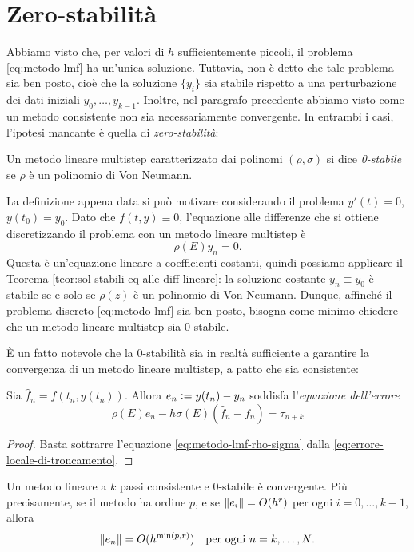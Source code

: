 \section{Zero-stabilità}
Abbiamo visto che, per valori di $h$ sufficientemente piccoli,
il problema \eqref{eq:metodo-lmf} ha un'unica soluzione.
Tuttavia, non è detto che tale problema sia ben posto,
cioè che la soluzione $\{y_i\}$ sia stabile rispetto a una perturbazione
dei dati iniziali $y_0,\dots,y_{k-1}$.
Inoltre, nel paragrafo precedente abbiamo visto come un metodo
consistente non sia necessariamente convergente.
In entrambi i casi, l'ipotesi mancante è quella di \emph{zero-stabilità}:

\begin{defi}
Un metodo lineare multistep caratterizzato dai polinomi $(\rho,\sigma)$
si dice \emph{0-stabile} se $\rho$ è un polinomio di Von Neumann.
\end{defi}

\noindent La definizione appena data si può motivare considerando il problema
$y'(t) = 0$, $y(t_0)=y_0$.
Dato che $f(t,y) \equiv 0$, l'equazione alle differenze che si ottiene
discretizzando il problema con un metodo lineare multistep è
\[
\rho(E)y_n = 0.
\]
Questa è un'equazione lineare a coefficienti costanti, quindi
possiamo applicare il Teorema \ref{teor:sol-stabili-eq-alle-diff-lineare}:
la soluzione costante $y_n \equiv y_0$ è stabile se e solo se
$\rho(z)$ è un polinomio di Von Neumann.
Dunque, affinché il problema discreto \eqref{eq:metodo-lmf} sia ben posto,
bisogna come minimo chiedere che un metodo lineare multistep sia
0-stabile.

È un fatto notevole che la 0-stabilità sia in realtà sufficiente a garantire
la convergenza di un metodo lineare multistep, a patto che sia consistente:

\begin{teor}
Sia $\hat{f}_n = f(t_n,y(t_n))$.
Allora $e_n \vcentcolon= y(t_n) - y_n$ soddisfa l'\emph{equazione dell'errore}
\begin{equation}\label{eq:equazione-dell-errore-lmf}
\rho(E) e_n - h \sigma(E) (\hat{f}_n-f_n) = \tau_{n+k}
\end{equation}
\end{teor}

\begin{proof}
Basta sottrarre l'equazione \eqref{eq:metodo-lmf-rho-sigma}
dalla \eqref{eq:errore-locale-di-troncamento}.
\end{proof}

\begin{teor}\label{teor:ordine-convergenza-lmf}
Un metodo lineare a $k$ passi consistente e 0-stabile è convergente.
Più precisamente, se il metodo ha ordine $p$,
e se $\left\lVert e_i\right\rVert = O(h^r)$ per ogni $i = 0,\dots,k-1$, allora
\[
\left\lVert e_n\right\rVert = O(h^{\min(p,r)}) \quad \text{per ogni $n = k,\dots,N$.}
\]
\end{teor}

